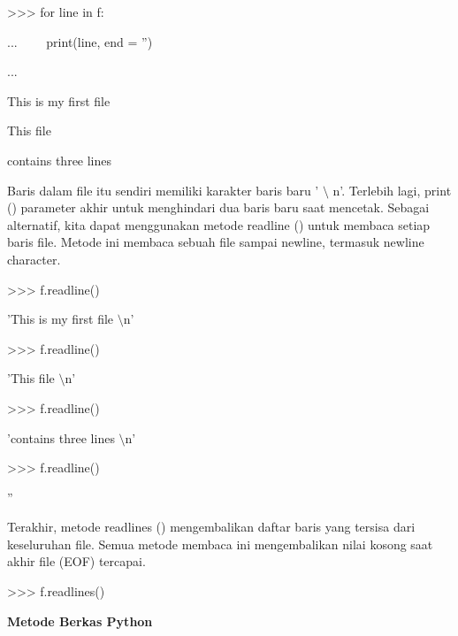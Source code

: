 \vspace{12pt}
\noindent 
>>> for line in f: \par
\noindent 
...~~~~ print(line, end = '') \par
\noindent 
... \par
\noindent 
This is my first file \par
\noindent 
This file \par
\noindent 
contains three lines \par
Baris dalam file itu sendiri memiliki karakter baris baru ' $  \setminus  $ n'. Terlebih lagi, print () parameter akhir untuk menghindari dua baris baru saat mencetak. Sebagai alternatif, kita dapat menggunakan metode readline () untuk membaca setiap baris file. Metode ini membaca sebuah file sampai newline, termasuk newline character. \par
\vspace{12pt}
\noindent 
>>> f.readline() \par
\noindent 
'This is my first file $  \setminus  $n' \par
\vspace{12pt}
\noindent 
>>> f.readline() \par
\noindent 
'This file $  \setminus  $n' \par
\vspace{12pt}
\noindent 
>>> f.readline() \par
\noindent 
'contains three lines $  \setminus  $n' \par
\vspace{12pt}
\noindent 
>>> f.readline() \par
\noindent 
'' \par
\vspace{12pt}
Terakhir, metode readlines () mengembalikan daftar baris yang tersisa dari keseluruhan file. Semua metode membaca ini mengembalikan nilai kosong saat akhir file (EOF) tercapai. \par
\vspace{12pt}
\noindent 
>>> f.readlines() \par
{} \par
\vspace{12pt}
\vspace{12pt}
\noindent 
{\fontsize{14pt}{14pt}\selectfont \textbf{Metode Berkas Python} \\} \par
\vspace{12pt}
